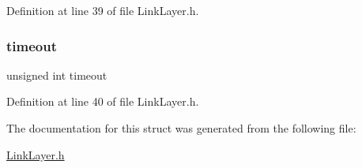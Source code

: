 Definition at line 39 of file Link\+Layer.\+h.

\hypertarget{struct_link_layers_a25af7eefd48048fb067a60b8e295caf1}{}\label{struct_link_layers_a25af7eefd48048fb067a60b8e295caf1} 
\subsubsection{\texorpdfstring{timeout}{timeout}}
{\footnotesize\ttfamily unsigned int timeout}



Definition at line 40 of file Link\+Layer.\+h.



The documentation for this struct was generated from the following file\+:\begin{DoxyCompactItemize}
\item 
\hyperlink{_link_layer_8h}{Link\+Layer.\+h}\end{DoxyCompactItemize}
